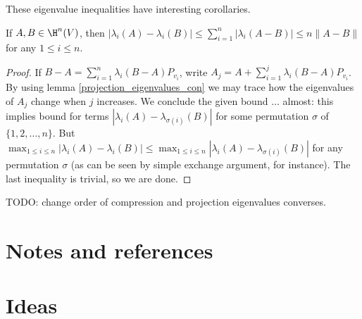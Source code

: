These eigenvalue inequalities have interesting corollaries.

\begin{kor}\label{spectrum_stability}
	If $A, B \in \H^{n}(V)$, then $|\lambda_{i}(A) - \lambda_{i}(B)| \leq \sum_{i = 1}^{n} |\lambda_{i}(A - B)| \leq n \|A - B\|$ for any $1 \leq i \leq n$.
\end{kor}
\begin{proof}
	If $B - A = \sum_{i = 1}^{n} \lambda_{i}(B - A) P_{v_{i}}$, write $A_{j} = A + \sum_{i = 1}^{j} \lambda_{i}(B - A) P_{v_{i}}$. By using lemma \ref{projection_eigenvalues_con} we may trace how the eigenvalues of $A_{j}$ change when $j$ increases. We conclude the given bound $\ldots$ almost: this implies bound for terms $|\lambda_{i}(A) - \lambda_{\sigma(i)}(B)|$ for some permutation $\sigma$ of $\{1, 2, \ldots, n\}$. But $\max_{1 \leq i \leq n} |\lambda_{i}(A) - \lambda_{i}(B)| \leq \max_{1 \leq i \leq n}|\lambda_{i}(A) - \lambda_{\sigma(i)}(B)|$ for any permutation $\sigma$ (as can be seen by simple exchange argument, for instance). The last inequality is trivial, so we are done.
\end{proof}

TODO: change order of compression and projection eigenvalues converses.

\section{Notes and references}

\section{Ideas}

